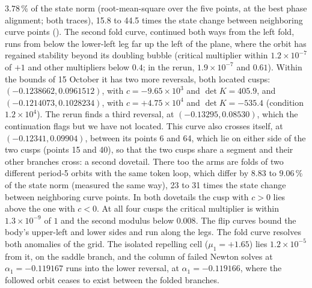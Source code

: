 \documentclass[11pt,letterpaper]{article}
\begin{document}
$3.78\,\%$ of the state norm (root-mean-square over the five points, at the best phase alignment; both traces), 15.8
to 44.5 times the state change between neighboring curve points (). The second fold curve, continued both ways from the left fold, runs from below the lower-left leg
far up the left of the plane, where the orbit has regained stability beyond its doubling bubble (critical
multiplier within $1.2\times10^{-7}$ of $+1$ and other multipliers below $0.4$; in the rerun, $1.9\times10^{-7}$ and
$0.61$). Within the bounds of 15 October it has two more reversals, both located
cusps: $(-0.1238662,0.0961512)$, with $c=-9.65\times10^{3}$ and $\det K=405.9$, and $(-0.1214073,0.1028234)$, with
$c=+4.75\times10^{4}$ and $\det K=-535.4$ (condition $1.2\times10^{4}$). The rerun finds a third reversal, at
$(-0.13295,0.08530)$, which the continuation flags but we have not located. This curve also crosses itself, at
$(-0.12341,0.09904)$, between its points 6 and 64, which lie on either side of the two cusps (points 15 and 40), so
that the two cusps share a segment and their other branches cross: a second dovetail. There too the arms are folds of
two different period-5 orbits with the same token loop, which differ by $8.83$ to $9.06\,\%$ of the state norm
(measured the same way), 23 to 31 times the state change between neighboring curve points. In both dovetails the cusp with
$c>0$ lies above the one with $c<0$. At all four cusps the critical multiplier is
within $1.3\times10^{-9}$ of $1$ and the second modulus below $0.008$. The flip curves bound the body's upper-left and
lower sides and run along the legs. The fold curve resolves both anomalies of the grid. The isolated repelling cell ($\mu_1=+1.65$)
lies $1.2\times10^{-5}$ from it, on the saddle branch, and the column of failed Newton solves at $\alpha_1=-0.119167$
runs into the lower reversal, at $\alpha_1=-0.119166$, where the followed orbit ceases to exist between the folded
branches.
\end{document}
